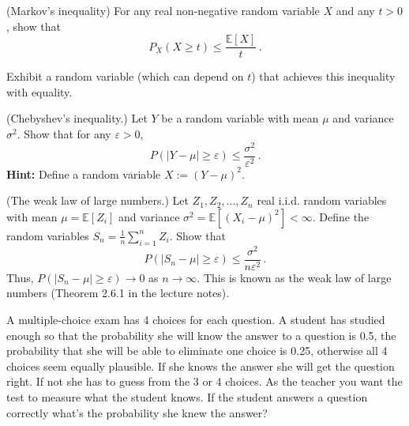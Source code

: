 \documentclass[a4paper,10pt,landscape,twocolumn]{scrartcl}
\begin{document}
\homeworkproblems

\begin{exercise}
	\begin{subex}[(3pt)] (Markov's inequality) For any real non-negative random variable $X$ and any $t > 0$, show that
	\[
	P_X(X \geq t) \leq \frac{\mathbb{E}[X]}{t}\, .
	\]
\end{subex}
\begin{subex}
	Exhibit a random variable (which can depend on $t$) that achieves this inequality with equality.
	\end{subex}
	\begin{subex}[(2pt)] (Chebyshev's inequality.) Let $Y$ be a random variable with mean $\mu$ and variance $\sigma^2$. Show that for any $\varepsilon > 0$,
	\[
	P(|Y - \mu| \geq \varepsilon) \leq \frac{\sigma^2}{\varepsilon^2} \, .
	\]
	\textbf{Hint:} Define a random variable $X := (Y - \mu)^2$.
	\end{subex}
	\begin{subex}[(2pt)] (The weak law of large numbers.) Let $Z_1, Z_2, ..., Z_n$ real i.i.d. random variables with mean $\mu = \mathbb{E}[Z_i]$ and variance $\sigma^2 = \mathbb{E}[(X_i - \mu)^2] < \infty$. Define the random variables $S_n = \frac{1}{n} \sum_{i=1}^n Z_i$. Show that
	\[
	P(|S_n - \mu | \geq \varepsilon) \leq \frac{\sigma^2}{n\varepsilon^2}\, .
	\]
	Thus, $P(|S_n - \mu| \geq \varepsilon) \to 0$ as $n \to \infty$. This is known as the weak law of large numbers (Theorem 2.6.1 in the lecture notes).
	\end{subex}
\end{exercise}

\begin{exercise}
A multiple-choice exam has 4 choices for each question. A student has studied enough so that the probability she will know the answer to a question is 0.5, the probability that she will be able to eliminate one choice is 0.25, otherwise all 4 choices seem equally plausible. If she knows the answer she will get the question right. If not she has to guess from the 3 or 4 choices.
As the teacher you want the test to measure what the student knows. If the student answers a question correctly what’s the probability she knew the answer?
\end{exercise}
\end{document}

